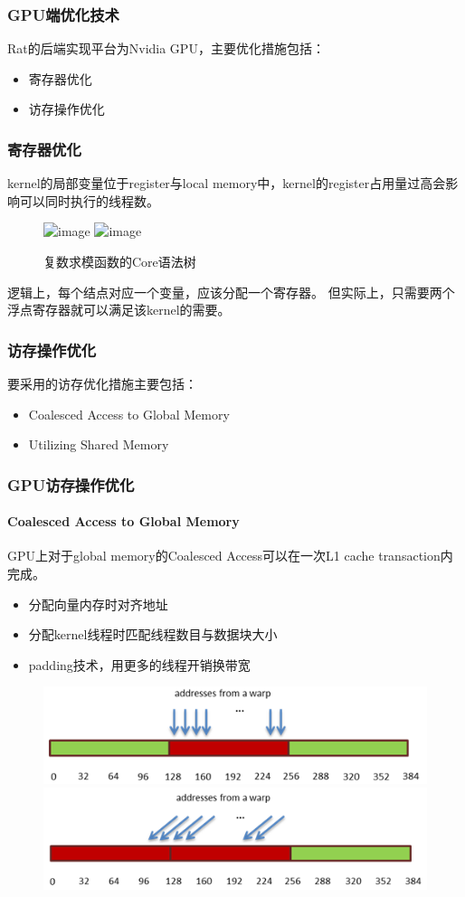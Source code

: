 \documentclass{beamer}
\begin{document}
\begin{frame}
  \frametitle{GPU端优化技术}
  Rat的后端实现平台为Nvidia GPU，主要优化措施包括：
  \begin{itemize}
    \item 寄存器优化
    \item 访存操作优化
  \end{itemize}
\end{frame}

\begin{frame}
  \frametitle{寄存器优化}
  kernel的局部变量位于register与local memory中，kernel的register占用量过高会影响可以同时执行的线程数。
  \begin{figure}
    \caption{复数求模函数的Core语法树}
    \includegraphics<1>[scale=0.2]{images/complex-length.png}
    \includegraphics<2>[scale=0.2]{images/complex-length-register.png}
  \end{figure}
  逻辑上，每个结点对应一个变量，应该分配一个寄存器。
  但实际上，只需要两个浮点寄存器就可以满足该kernel的需要。
\end{frame}

\begin{frame}
  \frametitle{访存操作优化}
  要采用的访存优化措施主要包括：
  \begin{itemize}
    \item Coalesced Access to Global Memory
    \item Utilizing Shared Memory
  \end{itemize}
\end{frame}

\begin{frame}
  \frametitle{GPU访存操作优化}
  \framesubtitle{Coalesced Access to Global Memory}
  GPU上对于global memory的Coalesced Access可以在一次L1 cache transaction内完成。
  \begin{itemize}
    \item 分配向量内存时对齐地址
    \item 分配kernel线程时匹配线程数目与数据块大小
    \item padding技术，用更多的线程开销换带宽
  \end{itemize}
  \begin{figure}
    \includegraphics[scale=0.4]{images/coalesced-access.png}\\
    \includegraphics[scale=0.4]{images/unaligned-sequential-addresses.png}
  \end{figure}
\end{frame}
\end{document}

